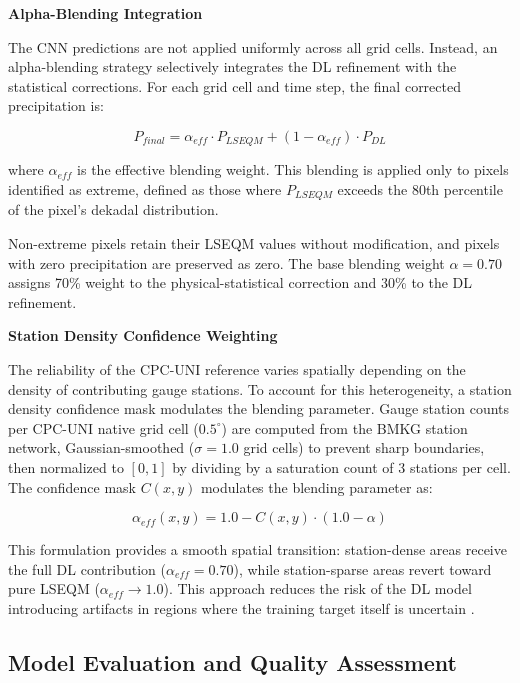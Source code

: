 \documentclass[remotesensing,article,submit,pdftex,moreauthors]{Definitions/mdpi}
\begin{document}
\textbf{Alpha-Blending Integration}

The CNN predictions are not applied uniformly across all grid cells.
Instead, an alpha-blending strategy selectively integrates the DL
refinement with the statistical corrections. For each grid cell and time
step, the final corrected precipitation is:

\[P_{final} = \alpha_{eff} \cdot P_{LSEQM} + (1 - \alpha_{eff}) \cdot P_{DL}\]

where \(\alpha_{eff}\) is the effective blending weight. This blending
is applied only to pixels identified as extreme, defined as those where
\(P_{LSEQM}\) exceeds the 80th percentile of the pixel's dekadal
distribution.

Non-extreme pixels retain their LSEQM values without modification, and
pixels with zero precipitation are preserved as zero. The base blending
weight \(\alpha = 0.70\) assigns 70\% weight to the physical-statistical
correction and 30\% to the DL refinement.

\textbf{Station Density Confidence Weighting}

The reliability of the CPC-UNI reference varies spatially depending on
the density of contributing gauge stations. To account for this
heterogeneity, a station density confidence mask modulates the blending
parameter. Gauge station counts per CPC-UNI native grid cell
(\(0.5^{\circ}\)) are computed from the BMKG station network,
Gaussian-smoothed (\(\sigma = 1.0\) grid cells) to prevent sharp
boundaries, then normalized to \([0, 1]\) by dividing by a saturation
count of 3 stations per cell. The confidence mask \(C(x, y)\) modulates
the blending parameter as:

\[\alpha_{eff}(x, y) = 1.0 - C(x, y) \cdot (1.0 - \alpha)\]

This formulation provides a smooth spatial transition: station-dense
areas receive the full DL contribution (\(\alpha_{eff} = 0.70\)), while
station-sparse areas revert toward pure LSEQM
(\(\alpha_{eff} \rightarrow 1.0\)). This approach reduces the risk of
the DL model introducing artifacts in regions where the training target
itself is uncertain \cite{ref27}.

\subsection{Model Evaluation and Quality
Assessment}\label{model-evaluation-and-quality-assessment}
\end{document}
